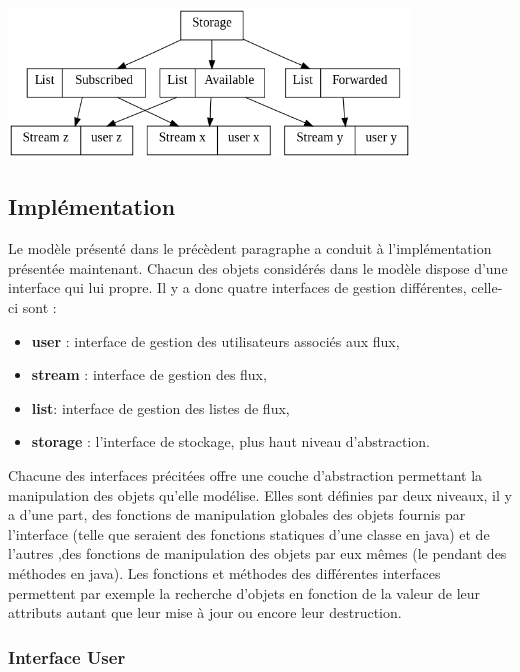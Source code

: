 \begin{center}
    \includegraphics[width=0.8\textwidth]{img/struct.png}
\end{center}

\subsection{Implémentation}

Le modèle présenté dans le précèdent paragraphe a conduit à l'implémentation
présentée maintenant. Chacun des objets considérés dans le modèle dispose d'une
interface qui lui propre. Il y a donc quatre interfaces de gestion différentes,
celle-ci sont : \\

\begin{itemize}
	\item \textbf{user} : interface de gestion des utilisateurs associés aux flux,
	\item \textbf{stream} : interface de gestion des flux,
	\item \textbf{list}:  interface de gestion des listes de flux,
	\item \textbf{storage} : l'interface de stockage, plus haut niveau d'abstraction. \\
\end{itemize}


Chacune des interfaces précitées offre une couche d'abstraction permettant la manipulation
des objets qu'elle modélise. Elles sont définies par deux niveaux, il y a d'une part, des
fonctions de manipulation globales des objets fournis par l'interface (telle que seraient
des fonctions statiques d'une classe en java) et de l'autres ,des fonctions de manipulation
des objets par eux mêmes (le pendant des méthodes en java). Les fonctions et méthodes des
différentes interfaces permettent par exemple la recherche d'objets en fonction de la valeur
de leur attributs autant que leur mise à jour ou encore leur destruction.

\subsubsection{Interface User}

